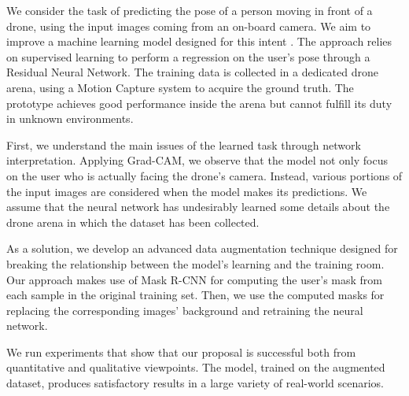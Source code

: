 

We consider the task of predicting the pose of a person moving in front of a drone, using the input images coming from an on-board camera. We aim to improve a machine learning model designed for this intent \cite{mantegazza2019visionbased}. The approach relies on supervised learning to perform a regression on the user's pose through a Residual Neural Network. The training data is collected in a dedicated drone arena, using a Motion Capture system to acquire the ground truth. The prototype achieves good performance inside the arena but cannot fulfill its duty in unknown environments.

First, we understand the main issues of the learned task through network interpretation. Applying Grad-CAM, we observe that the model not only focus on the user who is actually facing the drone’s camera. Instead, various portions of the input images are considered when the model makes its predictions. We assume that the neural network has undesirably learned some details about the drone arena in which the dataset has been collected.

As a solution, we develop an advanced data augmentation technique designed for
breaking the relationship between the model's learning and the training room. Our approach makes use of Mask R-CNN for computing the user's mask from each sample in the original training set. Then, we use the computed masks for replacing the corresponding images' background and retraining the neural network.

We run experiments that show that our proposal is successful both from quantitative and qualitative viewpoints. The model, trained on the augmented dataset, produces satisfactory results in a large variety of real-world scenarios.